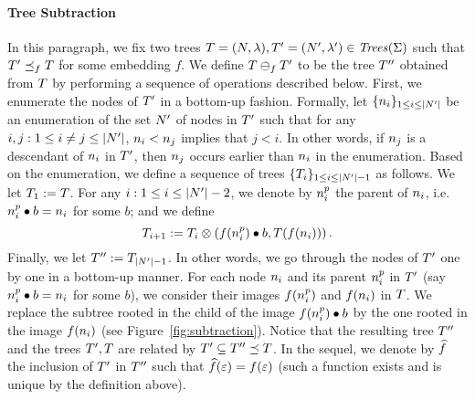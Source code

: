 \paragraph{\bf Tree Subtraction}
%
In this paragraph, we fix two trees $T=(N,\lambda),T'=(N',\lambda')\in
{\it Trees}({\Sigma})$ such that $T'\preceq_fT$ for some embedding $f$.
%
We define $T\ominus_fT'$ to be the tree $T''$ obtained from $T$ by performing
a sequence of operations described below.
%
First, we enumerate the nodes of $T'$ in a bottom-up fashion.
%
Formally, let $\{n_i\}_{1\le i\le|{N'}|}$ be an enumeration of the set $N'$ of
nodes in $T'$
such that for any $i,j:1\le i\neq j\le |{N'}|$, $n_i<n_j$ implies that
$j < i$.
%
In other words, if $n_j$ is a descendant of $n_i$ in $T'$, then
$n_j$ occurs earlier than $n_i$ in the enumeration.
%
Based on the enumeration, we define a sequence of trees $\{T_i\}_{1\le i\le|{N'}|-1}$
as follows.
%
We let $T_1:=T$.
%
For any $i:1\le i\le|{N'}|-2$, we denote by $n^p_i$ the parent of $n_i$, i.e.\ $n^p_i\bullet b=
n_i$ for some $b$; and we define
%
\[
T_{i+1}:=T_i\otimes\left(f(n_i^p)\bullet b,T(f(n_i))\right)\text{.}
\]
%
Finally, we let $T'':=T_{|{N'}|-1}$.
%
In other words, we go through the nodes of $T'$ one by one in a bottom-up manner.
%
For each node $n_i$ and its parent $n^p_i$ in $T'$ (say $n_i^p\bullet b=n_i$
for some $b$), we consider their images $f(n_i^p)$ and $f(n_i)$ in $T$.
%
We replace the subtree rooted in the child of the image
$f(n_i^p)\bullet b$ by the one rooted in the image $f(n_i)$ (see Figure~\ref{fig:subtraction}).
%
Notice that the resulting tree $T''$ and the trees $T',T$ are related by
$T'\subseteq T''\preceq T$.
%
In the sequel, we denote by $\widehat{f}$ the inclusion of $T'$ in $T''$ such that 
$\widehat{f}(\varepsilon)=f(\varepsilon)$ (such a function exists and is unique by 
the definition above).
%
